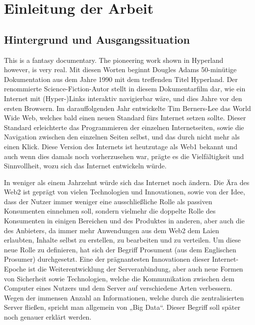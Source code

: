 \chapter{Einleitung der Arbeit}

\section{Hintergrund und Ausgangssituation}

This is a fantasy documentary. The pioneering work shown in Hyperland however, is very real.
Mit diesen Worten beginnt Dougles Adams 50-minütige Dokumentation aus dem Jahre 1990 mit dem treffenden Titel Hyperland. Der renommierte Science-Fiction-Autor stellt in diesem Dokumentarfilm dar, wie ein Internet mit (Hyper-)Links interaktiv navigierbar wäre, und dies Jahre vor den ersten Browsern.
Im darauffolgenden Jahr entwickelte Tim Berners-Lee das World Wide Web, welches bald einen neuen Standard fürs Internet setzen sollte. Dieser Standard erleichterte das Programmieren der einzelnen Internetseiten, sowie die Navigation zwischen den einzelnen Seiten selbst, und das durch nicht mehr als einen Klick. Diese Version des Internets ist heutzutage als Web1 bekannt und auch wenn dies damals noch vorherzusehen war, prägte es die Vielfältigkeit und Sinnvollheit, wozu sich das Internet entwickeln würde.

In weniger als einem Jahrzehnt würde sich das Internet noch ändern. Die Ära des Web2 ist geprägt von vielen Technologien und Innovationen, sowie von der Idee, dass der Nutzer immer weniger eine ausschließliche Rolle als passiven Konsumenten einnehmen soll, sondern vielmehr die doppelte Rolle des Konsumenten in einigen Bereichen und des Produktes in anderen, aber auch die des Anbieters, da immer mehr Anwendungen aus dem Web2 dem Laien erlaubten, Inhalte selbst zu erstellen, zu bearbeiten und zu verteilen. Um diese neue Rolle zu definieren, hat sich der Begriff Prosument (aus dem Englischen Prosumer) durchgesetzt.
Eine der prägnantesten Innovationen dieser Internet-Epoche ist die Weiterentwicklung der Serveranbindung, aber auch neue Formen von Sicherheit sowie Technologien, welche die Kommunikation zwischen dem Computer eines Nutzers und dem Server auf verschiedene Arten verbessern. Wegen der immensen Anzahl an Informationen, welche durch die zentralisierten Server fließen, spricht man allgemein von „Big Data“. Dieser Begriff soll später noch genauer erklärt werden.

